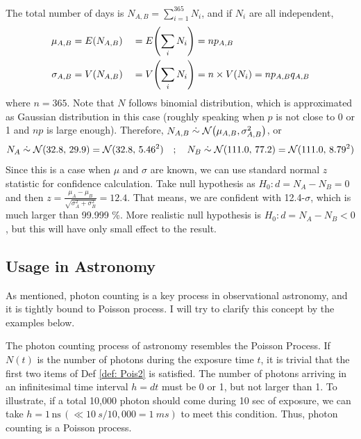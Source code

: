 The total number of days is $ N_{A, B} = \sum_{i=1}^{365} N_i $, and if $ N_i $ are all independent, 
\begin{equation*}
\begin{aligned}
  \mu_{A, B} &= E(N_{A, B}) &&= E\qty(\sum_{i} N_i) = np_{A, B} \\
  \sigma_{A, B} &= V(N_{A, B}) &&= V\qty(\sum_{i} N_i) = n \times V(N_i) = np_{A, B}q_{A, B}
\end{aligned}
\end{equation*}
where $ n = 365 $. Note that $ N $ follows binomial distribution, which is approximated as Gaussian distribution in this case (roughly speaking when $ p $ is not close to 0 or 1 and $ np $ is large enough). Therefore, $ N_{A, B} \mathrel{\dot{\sim}} \mathcal{N} \qty( \mu_{A, B}, \sigma_{A, B}^2 ) $, or
\begin{equation*}
  N_A \mathrel{\dot{\sim}} \mathcal{N}(32.8,\, 29.9) = \mathcal{N}(32.8,\, 5.46^2) \quad;\quad
  N_B \mathrel{\dot{\sim}} \mathcal{N}(111.0,\, 77.2) = \mathcal{N}(111.0,\, 8.79^2)
\end{equation*}
Since this is a case when $ \mu $ and $ \sigma $ are known, we can use standard normal $ z $ statistic for confidence calculation. Take null hypothesis as $ H_0 : d = N_A - N_B = 0 $ and then $ z = \frac{\mu_A - \mu_B}{\sqrt{\sigma_A^2 + \sigma_B^2}} = 12.4 $. That means, we are confident with 12.4-$ \sigma $, which is much larger than 99.999 \%. More realistic null hypothesis is $ H_0 : d = N_A - N_B < 0 $, but this will have only small effect to the result.


\subsection{Usage in Astronomy}
As mentioned, photon counting is a key process in observational astronomy, and it is tightly bound to Poisson process. I will try to clarify this concept by the examples below.

\begin{ex}
The photon counting process of astronomy resembles the Poisson Process. If $ N(t) $ is the number of photons during the exposure time $ t $, it is trivial that the first two items of Def \ref{def: Pois2} is satisfied. The number of photons arriving in an infinitesimal time interval $ h = dt $ must be 0 or 1, but not larger than 1. To illustrate, if a total 10,000 photon should come during 10 sec of exposure, we can take $ h = 1\,\mathrm{ns} \,(\ll \SI{10}{s} / 10,000 = \SI{1}{ms}) $ to meet this condition. Thus, photon counting is a Poisson process.
\end{ex}

